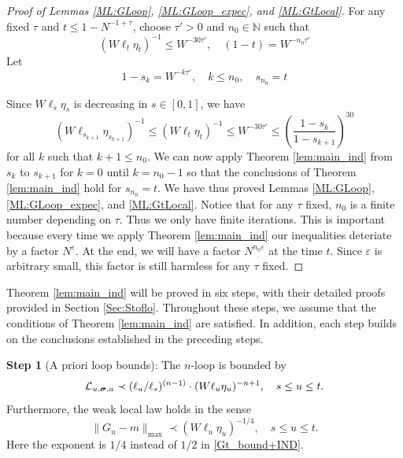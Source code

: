 \documentclass[10pt,reqno]{article}
\theoremstyle{plain} %
\theoremstyle{remark}
\numberwithin{equation}{section}
\begin{document}
\begin{proof}[Proof of Lemmas \ref{ML:GLoop}, \ref{ML:GLoop_expec},  and \ref{ML:GtLocal}]
For any fixed $\tau$ and  $t \le 1-N^{-1+\tau}$,  choose $\tau'>0$ and $n_0 \in \mathbb N$ such that 
$$
(W\ell_t\eta_t)^{-1}\le  W^{- 30 \tau'} , \quad (1-t) = W^{-n_0 \tau'}
$$
Let 
\[
1-s_{k} = W^{-k \tau'}, \quad k \le n_0, \quad s_{n_0} = t
\]
 
Since  $W\ell_s\eta_s$ is decreasing in  $s\in [0,1]$, we have 
   $$
(W\ell_{s_{k+1}}\eta_{s_{k+1}})^{-1}\le (W\ell_{t}\eta_{t})^{-1}\le W^{- 30\tau'}
\le \left(\frac{1-s_{k}}{1-s_{k+1}}\right)^{30}
$$
for all $k$ such that  $k+1\le n_0$. 
We can now apply  Theorem  \ref{lem:main_ind} from $s_k$ to $s_{k+1}$ for $k=0$ until $k=n_0-1$ so that the conclusions of  Theorem  \ref{lem:main_ind} hold for  $s_{n_0}=t$.  We have thus proved Lemmas \ref{ML:GLoop}, \ref{ML:GLoop_expec}, and \ref{ML:GtLocal}.  Notice that for any $\tau$ fixed, $n_0$ is a finite number depending on $\tau$.  Thus we only have finite iterations. This is important because every time we apply  Theorem  \ref{lem:main_ind} our inequalities deteriate by a factor 
$N^\varepsilon$. At the end, we will have a factor $N^{n_0 \varepsilon}$ at the time $t$. Since $\varepsilon$ is arbitrary small, this factor is still harmless for any $\tau$ fixed. 
\end{proof}


 
 
Theorem \ref{lem:main_ind} will be proved in six steps, with their detailed proofs provided in Section \ref{Sec:Stoflo}. Throughout these steps, we assume that the conditions of Theorem \ref{lem:main_ind} are satisfied. In addition, each step builds on the conclusions established in the preceding steps.

\medskip 
\noindent 
\textbf{Step 1}   (A priori loop bounds): The $n$-loop is bounded by 
 \begin{equation}\label{lRB1}
   {\cal L}_{u,\boldsymbol{\sigma}, \textbf{a}}\prec (\ell_u/\ell_s)^{(n-1)}\cdot 
   (W\ell_u\eta_u)^{-n+1},\quad  s\le u\le t.
\end{equation}
Furthermore,  the  weak local law holds in the sense 
\begin{equation}\label{Gtmwc}
    \|G_u-m\|_{\max}\prec  (W\ell_u\eta_u)^{-1/4},\quad s\le u\le t .
\end{equation} 
Here the exponent  is $1/4$ instead of $1/2$  in \eqref{Gt_bound+IND}. 
 
\end{document}
